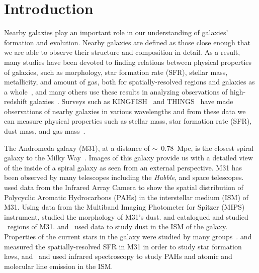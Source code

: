 \section{Introduction} 
Nearby galaxies play an important role in our understanding of galaxies' formation and evolution.
Nearby galaxies are defined as those close enough that we are able to observe their structure and composition in detail.
As a result, many studies have been devoted to finding relations between physical properties of galaxies, such as morphology, star formation rate (SFR), stellar mass, metallicity, and amount of gas, both for spatially-resolved regions and galaxies as a whole~\citep[e.g.][]{Wong13,Leroy08}, and many others use these results in analyzing observations of high-redshift galaxies~\citep[e.g.][]{Freundlich13,Walch11}.
Surveys such as KINGFISH~\citep{Kennicutt11} and THINGS~\citep{Walter08} have made observations of nearby galaxies in various wavelengths and from these data we can measure physical properties such as stellar mass, star formation rate (SFR), dust mass, and gas mass~\citep[e.g.][]{Eskew12,Dale09,Calzetti07}.

The Andromeda galaxy (M31), at a distance of $\sim$~0.78~Mpc, is the closest spiral galaxy to the Milky Way~\citep{McConnachie05}.
Images of this galaxy provide us with a detailed view of the inside of a spiral galaxy as seen from an external perspective.
M31 has been observed by many telescopes including the {\textit {Hubble}}, \Spitzer and \Herschel space telescopes. %
\cite{Barmby06} used data from the \Spitzer Infrared Array Camera \citep[IRAC;][]{Fazio04} to show the spatial distribution of Polycyclic Aromatic Hydrocarbons (PAHs) in the interstellar medium (ISM) of M31.
Using data from the Multiband Imaging Photometer for Spitzer (MIPS) instrument, \cite{Gordon06} studied the morphology of M31's dust.
\cite{Azimlu11} and \cite{Sanders12} catalogued and studied \hii~regions of M31.
\cite{Draine14, Mattsson14, Viaene14, Smith12} and~\cite{Fritz12} used \Herschel data to study dust in the ISM of the galaxy.
Properties of the current stars in the galaxy were studied by many groups~\citep[e.g.][and references therein]{Tamm12,Dalcanton12,Massey07}.
\cite{Rahmani16, Ford13} and \cite{Tabatabaei10} measured the spatially-resolved SFR in M31 in order to study star formation laws, and~\cite{Dim15} and \cite{Kapala15} used infrared spectroscopy to study PAHs and atomic and molecular line emission in the ISM.

